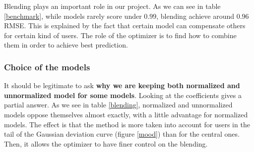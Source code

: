 \documentclass[10pt,conference,compsocconf]{IEEEtran}
\begin{document}
Blending plays an important role in our project. As we can see in table \ref{benchmark}, while models rarely score under $0.99$, blending achieve around $0.96$ RMSE. This is explained by the fact that certain model can compensate others for certain kind of users. The role of the optimizer is to find how to combine them in order to achieve best prediction.


\subsubsection{Choice of the models}

It should be legitimate to ask \textbf{why we are keeping both normalized and unnormalized model for
some models}. Looking at the coefficients gives a partial answer. As we see in table \ref{blending}, normalized and unnormalized models oppose themselves almost exactly, with a little advantage for normalized models. The effect is that the method is more taken into account for users in the tail of the Gaussian deviation curve (figure \ref{mood}) than for the central ones. Then, it allows the optimizer to have finer control on the blending.
\end{document}
